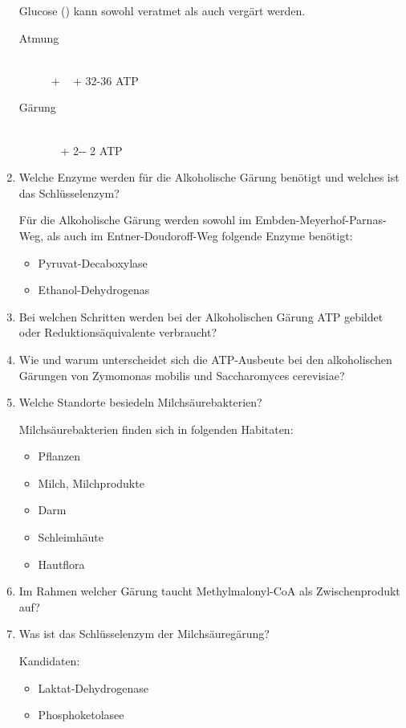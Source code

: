 \begin{enumerate}
	Glucose () kann sowohl veratmet als auch vergärt werden.	
		\begin{description}
			\item[Atmung] \hfill\\
				 +  \textrightarrow \  +  \hfill 32-36 ATP	
			\item[Gärung] \hfill\\
				 \textrightarrow \  + 2-- \hfill 2 ATP
		\end{description}

	\item Welche Enzyme werden für die Alkoholische Gärung benötigt und welches ist das Schlüsselenzym?

		Für die Alkoholische Gärung werden sowohl im Embden-Meyerhof-Parnas-Weg,
		als auch im Entner-Doudoroff-Weg folgende Enzyme benötigt:
		\begin{itemize}
			\item Pyruvat-Decaboxylase
			\item Ethanol-Dehydrogenas
		\end{itemize}
		
	\item Bei welchen Schritten werden bei der Alkoholischen Gärung ATP gebildet oder Reduktionsäquivalente verbraucht?
	\item Wie und warum unterscheidet sich die ATP-Ausbeute bei den alkoholischen Gärungen von Zymomonas mobilis und Saccharomyces cerevisiae?
	\item Welche Standorte besiedeln Milchsäurebakterien?
		
		Milchsäurebakterien finden sich in folgenden Habitaten:
		\begin{itemize}
			\item Pflanzen
			\item Milch, Milchprodukte
			\item Darm
			\item Schleimhäute
			\item Hautflora
		\end{itemize}

	\item Im Rahmen welcher Gärung taucht Methylmalonyl-CoA als Zwischenprodukt auf?
	\item Was ist das Schlüsselenzym der Milchsäuregärung?

		Kandidaten:
		\begin{itemize}
			\item Laktat-Dehydrogenase
			\item Phosphoketolasee
		\end{itemize}


\end{enumerate}
